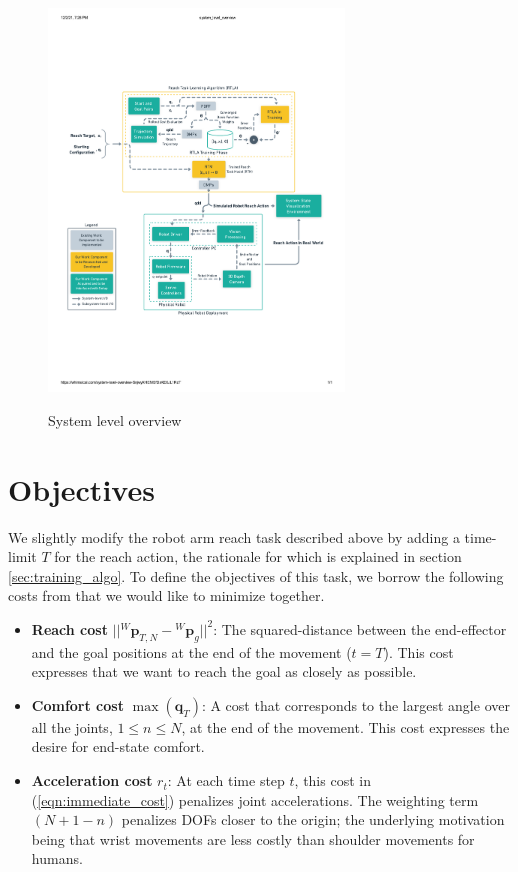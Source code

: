 \documentclass[10pt]{article}
\begin{document}
\begin{figure}[ht]
\centering
\includegraphics[width=0.7\textwidth]{system_level_overview.pdf}
\label{fig:system_level_overview}
\caption{System level overview}
\end{figure}

\section{Objectives}
We slightly modify the robot arm reach task described above by adding a time-limit $T$ for the reach action, the rationale for which is explained in section \ref{sec:training_algo}. To define the objectives of this task, we borrow the following costs from \cite{pdff} that we would like to minimize together.

\begin{itemize}
	\item \textbf{Reach cost} $||{^W\mathbf{p}_{T, N}} - {^W}\mathbf{p}_{g}||^2$: The squared-distance between the end-effector and the goal positions at the end of the movement ($t = T$). This cost expresses that we want to reach the goal as closely as possible.
	\item\textbf{Comfort cost} $\max(\mathbf{q}_T)$: A cost that corresponds to the largest angle over all  the joints, $1\leq n \leq N$, at the end of the movement. This cost expresses the desire for end-state comfort.
	\item \textbf{Acceleration cost} $r_t$: At each time step $t$, this cost in (\ref{eqn:immediate_cost}) penalizes joint accelerations. The weighting term $(N+1-n)$ penalizes DOFs closer to the origin; the underlying motivation being that wrist movements are less costly than shoulder movements for humans.
\end{itemize}
\end{document}
